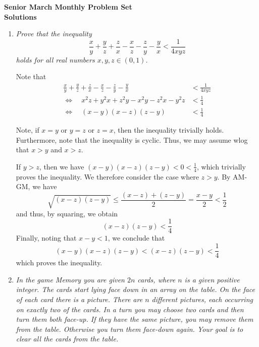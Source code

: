 \documentclass{article}
\begin{document}
\begin{center}
\textbf{\Large Senior March Monthly Problem Set}
\\ \vspace{1em}
\textbf{\large Solutions}
\end{center}

\begin{enumerate}[1.]

\item %
{\itshape Prove that the inequality
\[ \frac{x}{y} +\frac{y}{z} +\frac{z}{x} -\frac{x}{z} -\frac{z}{y} -\frac{y}{x} < \frac{1}{4xyz} \]
holds for all real numbers $x,y,z \in (0,1)$.}

Note that
\begin{align*}
    \frac{x}{y} +\frac{y}{z} +\frac{z}{x} -\frac{x}{z} -\frac{z}{y} -\frac{y}{x} &< \frac{1}{4xyz} \\
    \iff \quad x^2z + y^2x + z^2y - x^2y - z^2x - y^2 z &< \frac{1}{4} \\
    \iff \quad (x-y)(x-z)(z-y) &< \frac{1}{4}
\end{align*}

Note, if $x=y$ or $y=z$ or $z=x$, then the inequality trivially holds.  Furthermore, note that the inequality is cyclic.  Thus, we may assume wlog that $x > y$ and $x > z$.

If $y > z$, then we have $(x-y)(x-z)(z-y) < 0 < \frac{1}{4}$, which trivially proves the inequality.  We therefore consider the case where $z > y$.  By AM-GM, we have
\begin{equation*}
    \sqrt{(x-z)(z-y)} \leq \frac{(x-z) + (z-y)}{2} = \frac{x-y}{2} < \frac{1}{2}
\end{equation*}
and thus, by squaring, we obtain
\begin{equation*}
    (x-z)(z-y) < \frac{1}{4}
\end{equation*}
Finally, noting that $x - y < 1$, we conclude that
\begin{equation*}
    (x-y)(x-z)(z-y) < (x-z)(z-y) < \frac{1}{4}
\end{equation*}
which proves the inequality.

\vspace{6pt}
\item %
{\itshape In the game Memory you are given $2n$ cards, where $n$ is a given positive integer. The cards start lying face down in an array on the table. On the face of each card there is a picture. There are $n$ different pictures, each occurring on exactly two of the cards. In a turn you may choose two cards and then turn them both face-up. If they have the same picture, you may remove them from the table. Otherwise you turn them face-down again. Your goal is to clear all the cards from the table.

}
\end{enumerate}
\end{document}
